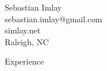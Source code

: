 \documentclass[9pt]{article}
\newenvironment{changemargin}[2]{%
  \begin{list}{}{%
    \setlength{\topsep}{0pt}%
    \setlength{\leftmargin}{#1}%
    \setlength{\rightmargin}{#2}%
    \setlength{\listparindent}{\parindent}%
    \setlength{\itemindent}{\parindent}%
    \setlength{\parsep}{\parskip}%
  }%
  \item[]}{\end{list}
}
\newcommand{\lineover}{
    \begin{changemargin}{-0.05in}{-0.05in}
        \vspace*{-8pt}
        \hrulefill \\
        \vspace*{-2pt}
    \end{changemargin}
}
\newcommand{\header}[1]{
    \begin{changemargin}{-0.5in}{-0.5in}
        {\large #1}\\
        \lineover
    \end{changemargin}
}
\newcommand{\contact}[4]{
    \begin{changemargin}{-0.5in}{-0.5in}
        \begin{center}
            {\Large {#1}}\\ \smallskip
            {#2}\\ \smallskip
            {#3}
        \end{center}
    \end{changemargin}
}
\begin{document}

\begin{changemargin}{-0.5in}{-0.5in}
    \begin{center}
        {\Large Sebastian Imlay}\\ \smallskip
        {sebastian.imlay@gmail.com}\\ \smallskip
        {simlay.net}\\ \smallskip
        {Raleigh, NC}
    \end{center}
\end{changemargin}


\header{Experience}
\end{document}
